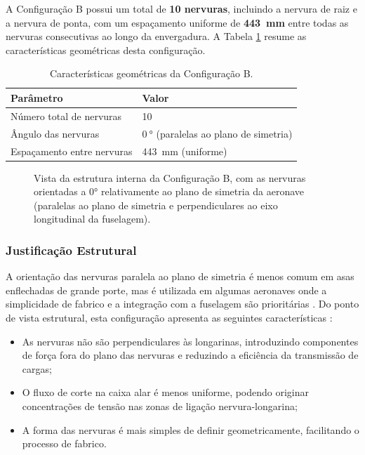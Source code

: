 \documentclass[a4paper,fleqn,noprintline]{cas-dc}
\begin{document}
A Configuração B possui um total de \textbf{10 nervuras}, incluindo a nervura de raiz e a nervura de ponta, com um espaçamento uniforme de \textbf{\SI{443}{\milli\meter}} entre todas as nervuras consecutivas ao longo da envergadura. A Tabela \ref{tab:config_b} resume as características geométricas desta configuração.

\begin{table}[h!]
\centering
\caption{Características geométricas da Configuração B.}
\label{tab:config_b}
\renewcommand{\arraystretch}{1.4}
\begin{tabularx}{\textwidth}{p{6cm} X}
\toprule
\textbf{Parâmetro} & \textbf{Valor} \\
\midrule
Número total de nervuras            & 10 \\
Ângulo das nervuras                 & $\qty{0}{\degree}$ (paralelas ao plano de simetria) \\
Espaçamento entre nervuras          & \SI{443}{\milli\meter} (uniforme) \\
\bottomrule
\end{tabularx}
\end{table}

\begin{figure}[h!]
    \centering
    \caption{Vista da estrutura interna da Configuração B, com as nervuras orientadas a 0° relativamente ao plano de simetria da aeronave (paralelas ao plano de simetria e perpendiculares ao eixo longitudinal da fuselagem).}
    \label{fig:config_b}
\end{figure}

\subsubsection{Justificação Estrutural}

A orientação das nervuras paralela ao plano de simetria é menos comum em asas enflechadas de grande porte, mas é utilizada em algumas aeronaves onde a simplicidade de fabrico e a integração com a fuselagem são prioritárias \cite{Raymer2018}. Do ponto de vista estrutural, esta configuração apresenta as seguintes características \cite{Niu1988}:

\begin{itemize}
    \item As nervuras não são perpendiculares às longarinas, introduzindo componentes de força fora do plano das nervuras e reduzindo a eficiência da transmissão de cargas;
    \item O fluxo de corte na caixa alar é menos uniforme, podendo originar concentrações de tensão nas zonas de ligação nervura-longarina;
    \item A forma das nervuras é mais simples de definir geometricamente, facilitando o processo de fabrico.
\end{itemize}
\end{document}
